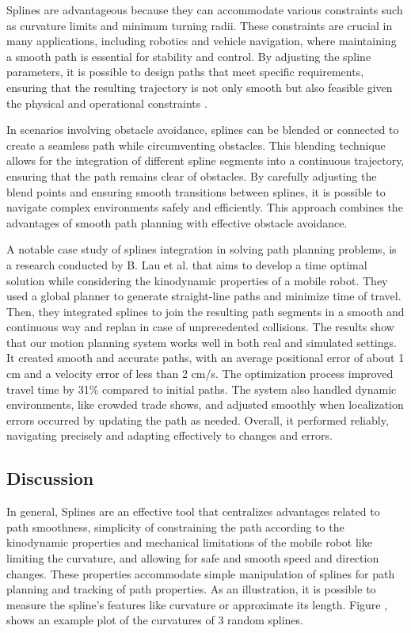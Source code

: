 Splines are advantageous because they can accommodate various constraints such as curvature limits 
and minimum turning radii. These constraints are crucial in many applications, including robotics 
and vehicle navigation, where maintaining a smooth path is essential for stability and control. 
By adjusting the spline parameters, it is possible to design paths that meet specific requirements, 
ensuring that the resulting trajectory is not only smooth but also feasible given the physical and 
operational constraints \cite{R30}.

In scenarios involving obstacle avoidance, splines can be blended or connected to create a seamless 
path while circumventing obstacles. This blending technique allows for the integration of different 
spline segments into a continuous trajectory, ensuring that the path remains clear of obstacles. 
By carefully adjusting the blend points and ensuring smooth transitions between splines, it is 
possible to navigate complex environments safely and efficiently. This approach combines the 
advantages of smooth path planning with effective obstacle avoidance.


A notable case study of splines integration in solving path planning problems, is a research conducted 
by B. Lau et al. \cite{R30} that aims to develop a time optimal solution while considering the kinodynamic 
properties of a mobile robot. They used a global planner to generate straight-line paths and minimize time 
of travel. Then, they  integrated splines to join the resulting path segments in a smooth and continuous 
way and replan in case of unprecedented collisions. The results show that our motion planning system works 
well in both real and simulated settings. It created smooth and accurate paths, with an average positional 
error of about 1 cm and a velocity error of less than 2 cm/s. The optimization process improved travel 
time by 31\% compared to initial paths. The system also handled dynamic environments, like crowded trade 
shows, and adjusted smoothly when localization errors occurred by updating the path as needed. Overall, 
it performed reliably, navigating precisely and adapting effectively to changes and errors.

\subsection{Discussion}
In general, Splines are an effective tool that centralizes advantages related to path smoothness, 
simplicity of constraining the path according to the kinodynamic properties and mechanical limitations of the 
mobile robot like limiting the curvature, and allowing for safe and smooth speed and direction changes. 
These properties accommodate simple manipulation of splines for path planning and tracking of path properties.
As an illustration, it is possible to measure the spline's features like curvature or approximate its length.
Figure , shows an example plot of the curvatures of 3 random splines.

